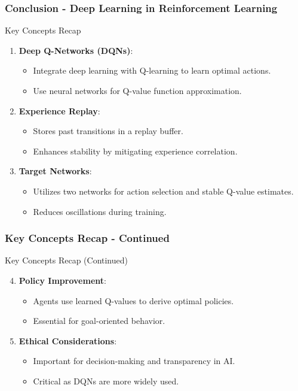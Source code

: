 \documentclass[aspectratio=169]{beamer}
\begin{document}
\begin{frame}[fragile]
    \frametitle{Conclusion - Deep Learning in Reinforcement Learning}
    \begin{block}{Key Concepts Recap}
        \begin{enumerate}
            \item \textbf{Deep Q-Networks (DQNs)}:
            \begin{itemize}
                \item Integrate deep learning with Q-learning to learn optimal actions.
                \item Use neural networks for Q-value function approximation.
            \end{itemize}
            \item \textbf{Experience Replay}:
            \begin{itemize}
                \item Stores past transitions in a replay buffer.
                \item Enhances stability by mitigating experience correlation.
            \end{itemize}
            \item \textbf{Target Networks}:
            \begin{itemize}
                \item Utilizes two networks for action selection and stable Q-value estimates.
                \item Reduces oscillations during training.
            \end{itemize}
        \end{enumerate}
    \end{block}
\end{frame}

\begin{frame}[fragile]
    \frametitle{Key Concepts Recap - Continued}
    \begin{block}{Key Concepts Recap (Continued)}
        \begin{enumerate}
            \setcounter{enumi}{3}
            \item \textbf{Policy Improvement}:
            \begin{itemize}
                \item Agents use learned Q-values to derive optimal policies.
                \item Essential for goal-oriented behavior.
            \end{itemize}
            \item \textbf{Ethical Considerations}:
            \begin{itemize}
                \item Important for decision-making and transparency in AI.
                \item Critical as DQNs are more widely used.
            \end{itemize}
        \end{enumerate}
    \end{block}
\end{frame}
\end{document}
